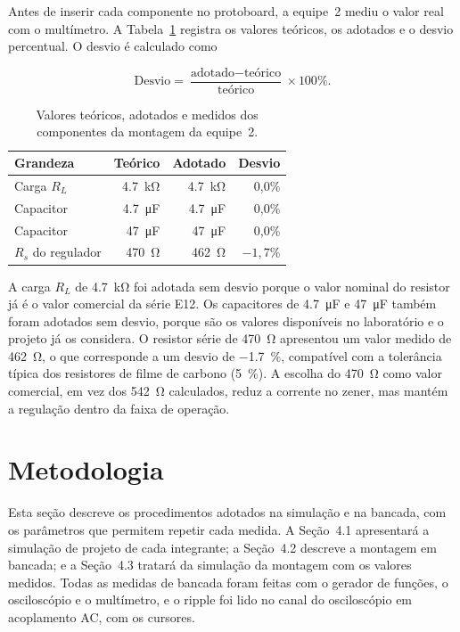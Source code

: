 \documentclass[11pt,a4paper]{article}
\begin{document}
Antes de inserir cada componente no protoboard, a equipe~2 mediu o valor real com o multímetro. A Tabela~\ref{tab:medidos_r5} registra os valores teóricos, os adotados e o desvio percentual. O desvio é calculado como
 
\begin{equation}
\text{Desvio} = \frac{\text{adotado} - \text{teórico}}{\text{teórico}} \times 100\% .
\label{eq:desvio}
\end{equation}
 
\begin{table}[h]
\centering
\caption{Valores teóricos, adotados e medidos dos componentes da montagem da equipe~2.}
\label{tab:medidos_r5}
\begin{tabular}{@{}lrrr@{}}
\toprule
\textbf{Grandeza} & \textbf{Teórico} & \textbf{Adotado} & \textbf{Desvio} \\
\midrule
Carga $R_L$ & \SI{4,7}{\kilo\ohm} & \SI{4,7}{\kilo\ohm} & 0,0\% \\
Capacitor & \SI{4,7}{\micro\farad} & \SI{4,7}{\micro\farad} & 0,0\% \\
Capacitor & \SI{47}{\micro\farad} & \SI{47}{\micro\farad} & 0,0\% \\
$R_s$ do regulador & \SI{470}{\ohm} & \SI{462}{\ohm} & $-1,7\%$ \\
\bottomrule
\end{tabular}
\end{table}
 
A carga $R_L$ de \SI{4,7}{\kilo\ohm} foi adotada sem desvio porque o valor nominal do resistor já é o valor comercial da série E12. Os capacitores de \SI{4,7}{\micro\farad} e \SI{47}{\micro\farad} também foram adotados sem desvio, porque são os valores disponíveis no laboratório e o projeto já os considera. O resistor série de \SI{470}{\ohm} apresentou um valor medido de \SI{462}{\ohm}, o que corresponde a um desvio de \SI{-1,7}{\%}, compatível com a tolerância típica dos resistores de filme de carbono (\SI{5}{\%}). A escolha do \SI{470}{\ohm} como valor comercial, em vez dos \SI{542}{\ohm} calculados, reduz a corrente no zener, mas mantém a regulação dentro da faixa de operação.

\section{Metodologia}
 
Esta seção descreve os procedimentos adotados na simulação e na bancada, com os parâmetros que permitem repetir cada medida. A Seção~4.1 apresentará a simulação de projeto de cada integrante; a Seção~4.2 descreve a montagem em bancada; e a Seção~4.3 tratará da simulação da montagem com os valores medidos. Todas as medidas de bancada foram feitas com o gerador de funções, o osciloscópio e o multímetro, e o ripple foi lido no canal do osciloscópio em acoplamento AC, com os cursores.
\end{document}
